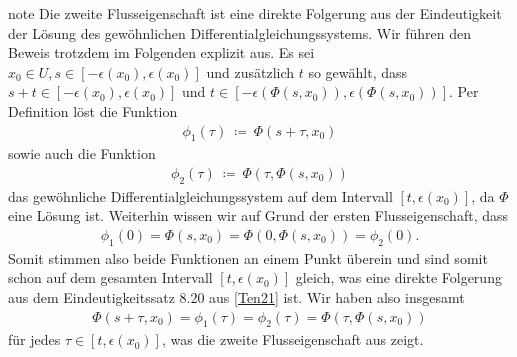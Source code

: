 \documentclass[letterpaper,10pt,english]{jupyterBook}
\begin{document}
\begin{sphinxadmonition}{note}
\sphinxAtStartPar
Die zweite Flusseigenschaft ist eine direkte Folgerung aus der Eindeutigkeit der Lösung des gewöhnlichen Differentialgleichungssystems.
Wir führen den Beweis trotzdem im Folgenden explizit aus.
Es sei \(x_0\in U, s\in [-\epsilon(x_0), \epsilon(x_0)]\) und zusätzlich \(t\) so gewählt, dass \(s+t \in [-\epsilon(x_0), \epsilon(x_0)]\) und \(t\in [-\epsilon(\Phi(s,x_0)), \epsilon(\Phi(s,x_0))]\).
Per Definition löst die Funktion
\begin{equation*}
\begin{split}\phi_1(\tau) \ \coloneqq \ \Phi(s + \tau, x_0)\end{split}
\end{equation*}
\sphinxAtStartPar
sowie auch die Funktion
\begin{equation*}
\begin{split}\phi_2(\tau) \ \coloneqq \ \Phi(\tau, \Phi(s,x_0))\end{split}
\end{equation*}
\sphinxAtStartPar
das gewöhnliche Differentialgleichungssystem auf dem Intervall \([t, \epsilon(x_0)]\), da \(\Phi\) eine Lösung ist.
Weiterhin wissen wir auf Grund der ersten Flusseigenschaft, dass
\begin{equation*}
\begin{split}\phi_1(0) = \Phi(s, x_0) = \Phi(0, \Phi(s, x_0)) = \phi_2(0).\end{split}
\end{equation*}
\sphinxAtStartPar
Somit stimmen also beide Funktionen an einem Punkt überein und sind somit schon auf dem gesamten Intervall \([t, \epsilon(x_0)]\) gleich, was eine direkte Folgerung aus dem Eindeutigkeitssatz 8.20 aus {[}\hyperlink{cite.references:id12}{Ten21}{]} ist.
Wir haben also insgesamt
\begin{equation*}
\begin{split}\Phi(s + \tau, x_0) = \phi_1(\tau) = \phi_2(\tau) = \Phi(\tau, \Phi(s,x_0))\end{split}
\end{equation*}
\sphinxAtStartPar
für jedes \(\tau\in [t, \epsilon(x_0)]\), was die zweite Flusseigenschaft aus {\hyperref[\detokenize{ode/fluesse:def:Fluss}]{}} zeigt.
\end{sphinxadmonition}
\end{document}
